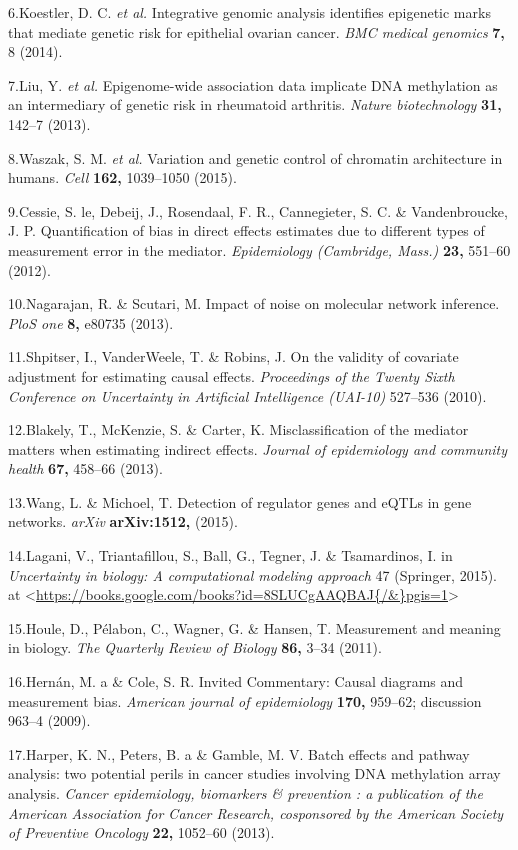 \documentclass[]{article}
\begin{document}
6.Koestler, D. C. \emph{et al.} Integrative genomic analysis identifies
epigenetic marks that mediate genetic risk for epithelial ovarian
cancer. \emph{BMC medical genomics} \textbf{7,} 8 (2014).

7.Liu, Y. \emph{et al.} Epigenome-wide association data implicate DNA
methylation as an intermediary of genetic risk in rheumatoid arthritis.
\emph{Nature biotechnology} \textbf{31,} 142--7 (2013).

8.Waszak, S. M. \emph{et al.} Variation and genetic control of chromatin
architecture in humans. \emph{Cell} \textbf{162,} 1039--1050 (2015).

9.Cessie, S. le, Debeij, J., Rosendaal, F. R., Cannegieter, S. C. \&
Vandenbroucke, J. P. Quantification of bias in direct effects estimates
due to different types of measurement error in the mediator.
\emph{Epidemiology (Cambridge, Mass.)} \textbf{23,} 551--60 (2012).

10.Nagarajan, R. \& Scutari, M. Impact of noise on molecular network
inference. \emph{PloS one} \textbf{8,} e80735 (2013).

11.Shpitser, I., VanderWeele, T. \& Robins, J. On the validity of
covariate adjustment for estimating causal effects. \emph{Proceedings of
the Twenty Sixth Conference on Uncertainty in Artificial Intelligence
(UAI-10)} 527--536 (2010).

12.Blakely, T., McKenzie, S. \& Carter, K. Misclassification of the
mediator matters when estimating indirect effects. \emph{Journal of
epidemiology and community health} \textbf{67,} 458--66 (2013).

13.Wang, L. \& Michoel, T. Detection of regulator genes and eQTLs in
gene networks. \emph{arXiv} \textbf{arXiv:1512,} (2015).

14.Lagani, V., Triantafillou, S., Ball, G., Tegner, J. \& Tsamardinos,
I. in \emph{Uncertainty in biology: A computational modeling approach}
47 (Springer, 2015). at
\textless{}\url{https://books.google.com/books?id=8SLUCgAAQBAJ\{/\&\}pgis=1}\textgreater{}

15.Houle, D., P{é}labon, C., Wagner, G. \& Hansen, T. Measurement and
meaning in biology. \emph{The Quarterly Review of Biology} \textbf{86,}
3--34 (2011).

16.Hern{á}n, M. a \& Cole, S. R. Invited Commentary: Causal diagrams and
measurement bias. \emph{American journal of epidemiology} \textbf{170,}
959--62; discussion 963--4 (2009).

17.Harper, K. N., Peters, B. a \& Gamble, M. V. Batch effects and
pathway analysis: two potential perils in cancer studies involving DNA
methylation array analysis. \emph{Cancer epidemiology, biomarkers \&
prevention : a publication of the American Association for Cancer
Research, cosponsored by the American Society of Preventive Oncology}
\textbf{22,} 1052--60 (2013).
\end{document}
